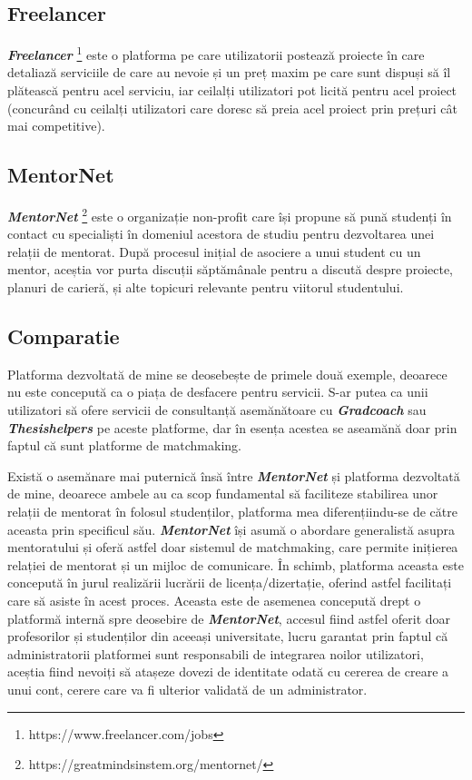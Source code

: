 \documentclass[12pt,a4paper,hidelinks]{report}
\theoremstyle{definition}
\theoremstyle{remark}
\begin{document}
\subsection{Freelancer}
\textbf{\textit{Freelancer}} \footnote[2]{https://www.freelancer.com/jobs} este o platforma pe care utilizatorii postează proiecte în care detaliază serviciile de care au nevoie și un preț maxim pe care sunt dispuși să îl plătească pentru acel serviciu, iar ceilalți utilizatori pot licită pentru acel proiect (concurând cu ceilalți utilizatori care doresc să preia acel proiect prin prețuri cât mai competitive).
\subsection{MentorNet}
\textbf{\textit{MentorNet}} \footnote[3]{https://greatmindsinstem.org/mentornet/} este o organizație non-profit care își propune să pună studenți în contact cu specialiști în domeniul acestora de studiu pentru dezvoltarea unei relații de mentorat. După procesul inițial de asociere a unui student cu un mentor, aceștia vor purta discuții săptămânale  pentru a discută despre proiecte, planuri de carieră, și alte topicuri relevante pentru viitorul studentului.
\subsection{Comparatie}
Platforma dezvoltată de mine se deosebește de primele două exemple, deoarece nu este concepută ca o piața de desfacere pentru servicii. S-ar putea ca unii utilizatori să ofere servicii de consultanță asemănătoare cu \textbf{\textit{Gradcoach}} sau \textbf{\textit{Thesishelpers}} pe aceste platforme, dar în esența acestea se aseamănă doar prin faptul că sunt platforme de matchmaking.

Există o asemănare mai puternică însă între \textbf{\textit{MentorNet}} și platforma dezvoltată de mine, deoarece ambele au ca scop fundamental să faciliteze stabilirea unor relații de mentorat în folosul studenților, platforma mea diferențiindu-se de către aceasta prin specificul său. \textbf{\textit{MentorNet}} își asumă o abordare generalistă asupra mentoratului și oferă astfel doar sistemul de matchmaking, care permite inițierea relației de mentorat și un mijloc de comunicare. În schimb, platforma aceasta este concepută în jurul realizării lucrării de licența/dizertație, oferind astfel facilitați care să asiste în acest proces. Aceasta este de asemenea concepută drept o platformă internă spre deosebire de \textbf{\textit{MentorNet}}, accesul fiind astfel oferit doar profesorilor și studenților din aceeași universitate, lucru garantat prin faptul că administratorii platformei sunt responsabili de integrarea noilor utilizatori, aceștia fiind nevoiți să atașeze dovezi de identitate odată cu cererea de creare a unui cont, cerere care va fi ulterior validată de un administrator.
\end{document}
